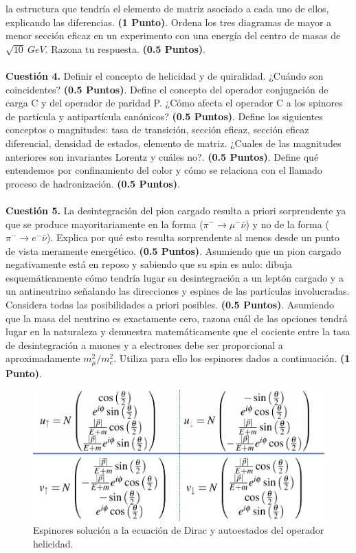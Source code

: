 \documentclass[paper=a4, fontsize=11pt]{scrartcl} %
\numberwithin{equation}{section} %
\numberwithin{figure}{section} %
\numberwithin{table}{section} %
\begin{document}
la estructura que tendría el elemento de matriz asociado a cada uno de ellos, explicando las diferencias. \textbf{(1 Punto)}. Ordena los tres diagramas de mayor a menor sección eficaz en un experimento con
una energía del centro de masas de $\sqrt{10}~GeV$. Razona tu respuesta. \textbf{(0.5 Puntos)}.  
\\
\\
\textbf{Cuestión 4.} Definir el concepto de helicidad y de quiralidad. ¿Cuándo son coincidentes? \textbf{(0.5 Puntos)}. Define el concepto del operador conjugación de carga C y del operador de paridad P. ¿Cómo afecta
el operador C a los spinores de partícula y antipartícula canónicos? \textbf{(0.5 Puntos)}. Define los siguientes conceptos o magnitudes: tasa de transición, sección eficaz, sección eficaz diferencial, densidad de estados,
elemento de matriz. ¿Cuales de las magnitudes anteriores son invariantes Lorentz y cuáles no?. \textbf{(0.5 Puntos)}. Define qué entendemos por confinamiento del color y cómo se relaciona con el llamado proceso de
hadronización. \textbf{(0.5 Puntos)}.
\\
\\
\textbf{Cuestión 5.} La desintegración del pion cargado resulta a priori sorprendente ya que se produce mayoritariamente en la forma ($\pi^{-}\rightarrow\mu^{-}\bar{\nu}$) y no de la forma ($\pi^{-}\rightarrow e^{-}\bar{\nu}$). Explica
por qué esto resulta sorprendente al menos desde un punto de vista meramente energético. \textbf{(0.5 Puntos)}. Asumiendo que un pion cargado negativamente está en reposo y sabiendo que su spin es nulo: dibuja esquemáticamente
cómo tendría lugar su desintegración a un leptón cargado y a un antineutrino señalando las direcciones y espines de las partículas involucradas. Considera todas las posibilidades a priori posibles. \textbf{(0.5 Puntos)}. 
Asumiendo que la masa del neutrino es exactamente cero, razona cuál de las opciones tendrá lugar en la naturaleza y demuestra matemáticamente que el cociente entre la tasa de desintegración a muones y a electrones 
debe ser proporcional a aproximadamente $m_{\mu}^2/m_{e}^2$. Utiliza para ello los espinores dados a continuación. \textbf{(1 Punto)}. 
  

\begin{figure}[!h]
\begin{center}
\includegraphics[width=0.6\linewidth]{espinores.png}
\end{center}
\caption{Espinores solución a la ecuación de Dirac y autoestados del operador helicidad.}
\label{espinores}
\end{figure}
\end{document}
